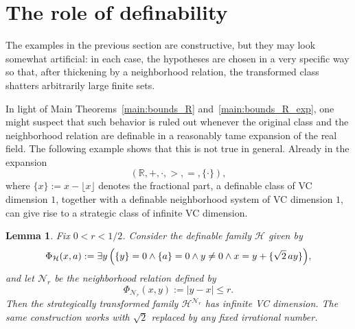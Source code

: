 \documentclass[11pt]{article}
\theoremstyle{plain}
\newtheorem{lemma}[theorem]{Lemma}
\theoremstyle{definition}
\theoremstyle{remark}
\newcommand{\R}{\mathbb{R}}
\begin{document}
\section{The role of definability}
\label{app:sec:role-of-definability}

The examples in the previous section are constructive, but they may look
somewhat artificial: in each case, the hypotheses are chosen in a very specific
way so that, after thickening by a neighborhood relation, the transformed class
shatters arbitrarily large finite sets.

In light of Main Theorems~\ref{main:bounds_R} and~\ref{main:bounds_R_exp}, one
might suspect that such behavior is ruled out whenever the original class and
the neighborhood relation are definable in a reasonably tame expansion
of the real field. The following example shows that this is not true in general.
Already in the expansion
\[
  (\R,+,\cdot,>,=,\{\cdot\}),
\]
where \(\{x\}:=x-\lfloor x\rfloor\) denotes the fractional part, a  definable class of VC dimension \(1\), together with a definable neighborhood system of VC dimension \(1\), can give rise to a strategic class of infinite VC dimension.

\begin{lemma}\label{lem:frac}
Fix \(0<r<1/2\). Consider the definable family \(\mathcal H\) given by
\[
\Phi_{\mathcal H}(x,a)
:=
\exists y\,
\Bigl(
  \{y\}=0
  \wedge \{a\}=0
  \wedge y\neq 0
  \wedge x=y+\{\sqrt2\,ay\}
\Bigr),
\]
and let \(\mathcal N_r\) be the neighborhood relation defined by
\[
\Phi_{\mathcal N_r}(x,y):=|y-x|\le r.
\]
Then the strategically transformed family \(\mathcal H^{\mathcal N_r}\) has infinite VC
dimension. The same construction works with \(\sqrt2\) replaced by any fixed
irrational number.
\end{lemma}
\end{document}
